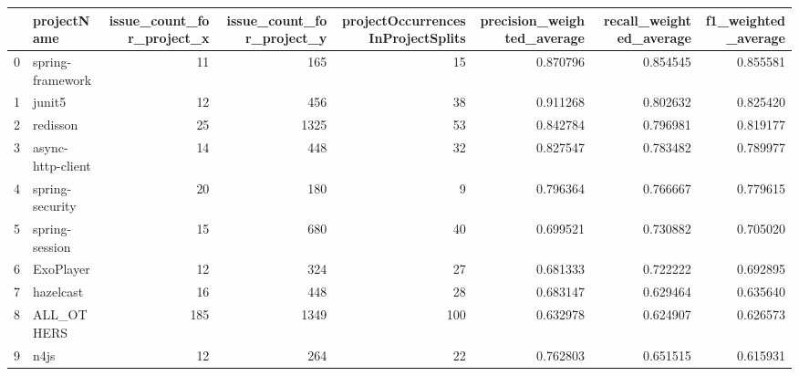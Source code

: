 \begin{tabular}{llrrrrrr}
\toprule
{} &        projectName &  issue\_count\_for\_project\_x &  issue\_count\_for\_project\_y &  projectOccurrencesInProjectSplits &  precision\_weighted\_average &  recall\_weighted\_average &  f1\_weighted\_average \\
\midrule
0  &   spring-framework &                         11 &                        165 &                                 15 &                    0.870796 &                 0.854545 &             0.855581 \\
1  &             junit5 &                         12 &                        456 &                                 38 &                    0.911268 &                 0.802632 &             0.825420 \\
2  &           redisson &                         25 &                       1325 &                                 53 &                    0.842784 &                 0.796981 &             0.819177 \\
3  &  async-http-client &                         14 &                        448 &                                 32 &                    0.827547 &                 0.783482 &             0.789977 \\
4  &    spring-security &                         20 &                        180 &                                  9 &                    0.796364 &                 0.766667 &             0.779615 \\
5  &     spring-session &                         15 &                        680 &                                 40 &                    0.699521 &                 0.730882 &             0.705020 \\
6  &          ExoPlayer &                         12 &                        324 &                                 27 &                    0.681333 &                 0.722222 &             0.692895 \\
7  &          hazelcast &                         16 &                        448 &                                 28 &                    0.683147 &                 0.629464 &             0.635640 \\
8  &         ALL\_OTHERS &                        185 &                       1349 &                                100 &                    0.632978 &                 0.624907 &             0.626573 \\
9  &               n4js &                         12 &                        264 &                                 22 &                    0.762803 &                 0.651515 &             0.615931 \\

\end{tabular}
